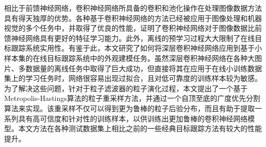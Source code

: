 {%
相比于前馈神经网络，卷积神经网络所具备的卷积和池化操作在处理图像数据方法具有得天独厚的优势。各种基于卷积神经网络的方法已经被应用于图像处理和机器视觉的多个任务中，并取得了优良的性能，证明了卷积神经网络对于图像数据比前馈神经网络具有更好的特征学习能力。此外，离线的预学习过程大大限制了在线目标跟踪系统实用性。有鉴于此，本文研究了如何将深层卷积神经网络应用到基于小样本集的在线目标跟踪系统中的外观建模任务。虽然深层卷积神经网络在各种大图片、多数据量的离线任务中取得了巨大成功，但直接将其在应用于在线小训练数据集上的学习任务时，网络很容易出现过拟合，且对低可靠度的训练样本较为敏感。为了解决这些问题，针对于粒子滤波器的粒子演化过程，本文提出了一个基于Metropolis-Hastings算法的粒子重采样方法，并通过一个自顶至底的广度优先分割算法来实现。该重采样不仅可以得到更为鲁棒的粒子后验分布，而且有助于提取一系列具有高可信度和针对性的训练样本，以供训练出更加鲁棒的卷积神经网络模型。本文方法在各种测试数据集上相比之前的一些经典目标跟踪方法有较大的性能提升。

}

